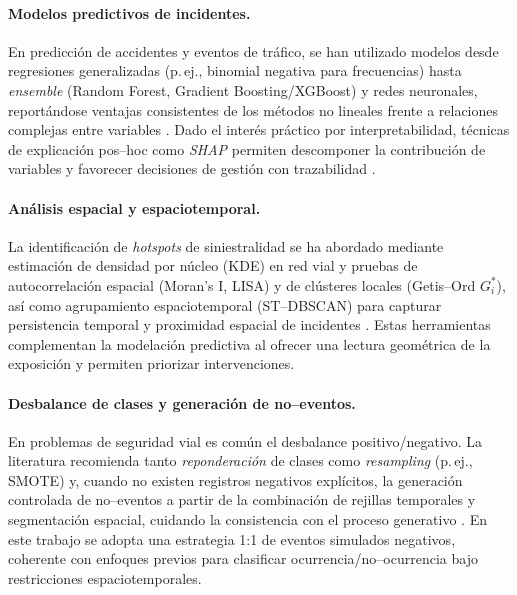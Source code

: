 \documentclass[12pt]{article}
\begin{document}
\paragraph{Modelos predictivos de incidentes.}
En predicción de accidentes y eventos de tráfico, se han utilizado modelos desde regresiones generalizadas (p.\,ej., binomial negativa para frecuencias) hasta \textit{ensemble} (Random Forest, Gradient Boosting/XGBoost) y redes neuronales, reportándose ventajas consistentes de los métodos no lineales frente a relaciones complejas entre variables \parencite{lord2010crashfreq, chen2016xgboost, vanlint2005, berhanu2024}. Dado el interés práctico por interpretabilidad, técnicas de explicación pos–hoc como \textit{SHAP} permiten descomponer la contribución de variables y favorecer decisiones de gestión con trazabilidad \parencite{lundberg2017shap}.

\paragraph{Análisis espacial y espaciotemporal.}
La identificación de \textit{hotspots} de siniestralidad se ha abordado mediante estimación de densidad por núcleo (KDE) en red vial y pruebas de autocorrelación espacial (Moran's I, LISA) y de clústeres locales (Getis–Ord $G_i^*$), así como agrupamiento espaciotemporal (ST–DBSCAN) para capturar persistencia temporal y proximidad espacial de incidentes \parencite{xie2013kde, moran1950, anselin1995lisa, getis1992, birant2007stdbscan}. Estas herramientas complementan la modelación predictiva al ofrecer una lectura geométrica de la exposición y permiten priorizar intervenciones.

\paragraph{Desbalance de clases y generación de no–eventos.}
En problemas de seguridad vial es común el desbalance positivo/negativo. La literatura recomienda tanto \textit{reponderación} de clases como \textit{resampling} (p.\,ej., SMOTE) y, cuando no existen registros negativos explícitos, la generación controlada de no–eventos a partir de la combinación de rejillas temporales y segmentación espacial, cuidando la consistencia con el proceso generativo \parencite{chawla2002smote, goedertier2009robust}. En este trabajo se adopta una estrategia 1:1 de eventos simulados negativos, coherente con enfoques previos para clasificar ocurrencia/no–ocurrencia bajo restricciones espaciotemporales.
\end{document}

